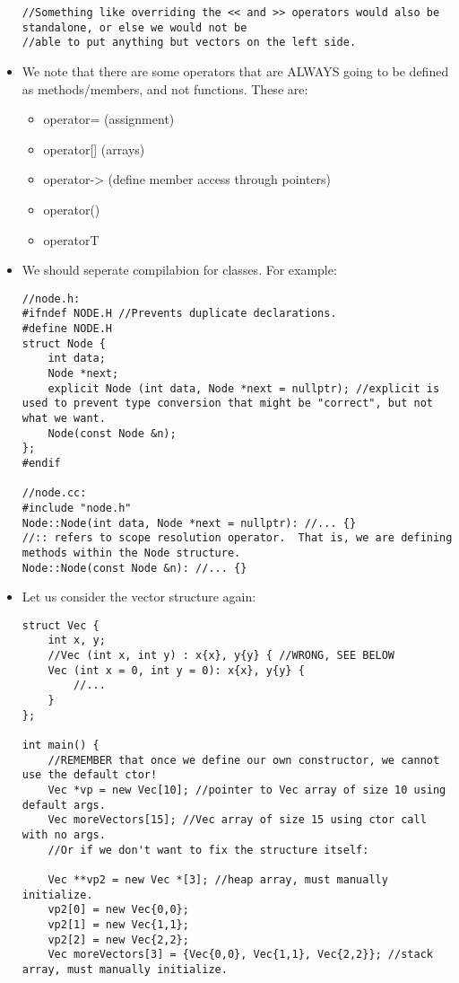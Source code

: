 \documentclass{article}
\begin{document}
\begin{itemize}
\begin{lstlisting}
//Something like overriding the << and >> operators would also be standalone, or else we would not be
//able to put anything but vectors on the left side.
\end{lstlisting}
\item We note that there are some operators that are ALWAYS going to be defined as methods/members, and not functions.  These are:
\begin{itemize}
    \item operator= (assignment)
    \item operator[] (arrays)
    \item operator-> (define member access through pointers)
    \item operator() 
    \item operatorT
\end{itemize}
\item We should seperate compilabion for classes.  For example:
\begin{lstlisting}
//node.h:
#ifndef NODE.H //Prevents duplicate declarations. 
#define NODE.H
struct Node {
    int data;
    Node *next;
    explicit Node (int data, Node *next = nullptr); //explicit is used to prevent type conversion that might be "correct", but not what we want.
    Node(const Node &n);
};
#endif

//node.cc:
#include "node.h"
Node::Node(int data, Node *next = nullptr): //... {} 
//:: refers to scope resolution operator.  That is, we are defining methods within the Node structure.
Node::Node(const Node &n): //... {}
\end{lstlisting}
\item Let us consider the vector structure again:
\begin{lstlisting}
struct Vec {
    int x, y;
    //Vec (int x, int y) : x{x}, y{y} { //WRONG, SEE BELOW
    Vec (int x = 0, int y = 0): x{x}, y{y} {
        //...
    }
};

int main() {
    //REMEMBER that once we define our own constructor, we cannot use the default ctor!
    Vec *vp = new Vec[10]; //pointer to Vec array of size 10 using default args.
    Vec moreVectors[15]; //Vec array of size 15 using ctor call with no args.
    //Or if we don't want to fix the structure itself:
    
    Vec **vp2 = new Vec *[3]; //heap array, must manually initialize.
    vp2[0] = new Vec{0,0};
    vp2[1] = new Vec{1,1};
    vp2[2] = new Vec{2,2};
    Vec moreVectors[3] = {Vec{0,0}, Vec{1,1}, Vec{2,2}}; //stack array, must manually initialize.



\end{lstlisting}
\end{itemize}
\end{document}
